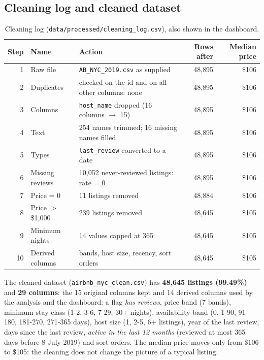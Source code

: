 \documentclass[12pt,a4paper]{article}
\begin{document}
\subsection{Cleaning log and cleaned dataset}

\begin{table}[H]\centering\small
\caption{Cleaning log (\texttt{data/processed/cleaning\_log.csv}), also shown in the dashboard.}
\begin{tabularx}{\linewidth}{@{}rlXrr@{}}
\toprule
Step & Name & Action & Rows after & Median price\\\midrule
1 & Raw file & \texttt{AB\_NYC\_2019.csv} as supplied & 48{,}895 & \$106\\
2 & Duplicates & checked on the id and on all other columns: none & 48{,}895 & \$106\\
3 & Columns & \texttt{host\_name} dropped (16 columns $\to$ 15) & 48{,}895 & \$106\\
4 & Text & 254 names trimmed; 16 missing names filled & 48{,}895 & \$106\\
5 & Types & \texttt{last\_review} converted to a date & 48{,}895 & \$106\\
6 & Missing reviews & 10{,}052 never-reviewed listings: rate = 0 & 48{,}895 & \$106\\
7 & Price = 0 & 11 listings removed & 48{,}884 & \$106\\
8 & Price $>$ \$1{,}000 & 239 listings removed & 48{,}645 & \$105\\
9 & Minimum nights & 14 values capped at 365 & 48{,}645 & \$105\\
10 & Derived columns & bands, host size, recency, sort orders & 48{,}645 & \$105\\
\bottomrule
\end{tabularx}
\end{table}

The cleaned dataset (\texttt{airbnb\_nyc\_clean.csv}) has \textbf{48{,}645 listings (99.49\%)}
and \textbf{29 columns}: the 15 original columns kept and 14 derived columns used by the analysis and
the dashboard: a flag \emph{has reviews}, price band (7 bands), minimum-stay class (1-2, 3-6, 7-29, 30+ nights), availability band
(0, 1-90, 91-180, 181-270, 271-365 days), host size (1, 2-5, 6+ listings), year of the last review,
days since the last review, \emph{active in the last 12 months} (reviewed at most 365 days before
8 July 2019) and sort orders. The median price moves only from \$106 to \$105: the cleaning does
not change the picture of a typical listing.
\end{document}
